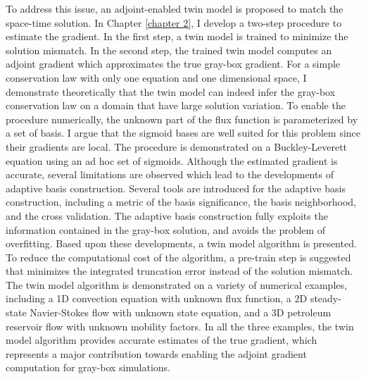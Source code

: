 To address this issue, an adjoint-enabled twin model is proposed 
to match the space-time solution.
In Chapter \ref{chapter 2}, I develop a two-step procedure to estimate the gradient.
In the first step, a twin model is trained to minimize the solution mismatch.
In the second step, the trained twin model
computes an adjoint gradient which approximates the true gray-box gradient.
For a simple conservation law with only one equation and one dimensional space,
I demonstrate theoretically that the twin model can indeed infer the gray-box 
conservation law on a domain that have large solution variation.
To enable the procedure numerically,
the unknown part of the flux function is parameterized by a set of basis.
I argue that the sigmoid bases are well suited for this problem since
their gradients are local. The procedure is demonstrated
on a Buckley-Leverett equation using an ad hoc set of sigmoids.
Although the estimated gradient is accurate, several limitations are observed
which lead to the developments of adaptive basis construction.
Several tools are introduced for the adaptive basis construction,
including a metric of the basis significance, the basis neighborhood, 
and the cross validation.
The adaptive basis construction 
fully exploits the information contained in the
gray-box solution, and avoids the problem of overfitting.
Based upon these developments, a twin model algorithm is presented.
To reduce the computational cost of the algorithm, a pre-train step is suggested
that minimizes the integrated truncation error instead of the solution mismatch.
The twin model algorithm is demonstrated on 
a variety of numerical examples, including a 1D convection equation with unknown 
flux function, a 2D steady-state Navier-Stokes flow with unknown state equation,
and a 3D petroleum reservoir flow with unknown mobility factors.
In all the three examples, the twin model algorithm provides accurate estimates
of the true gradient, which represents a major contribution towards enabling the
adjoint gradient computation for gray-box simulations.\\

